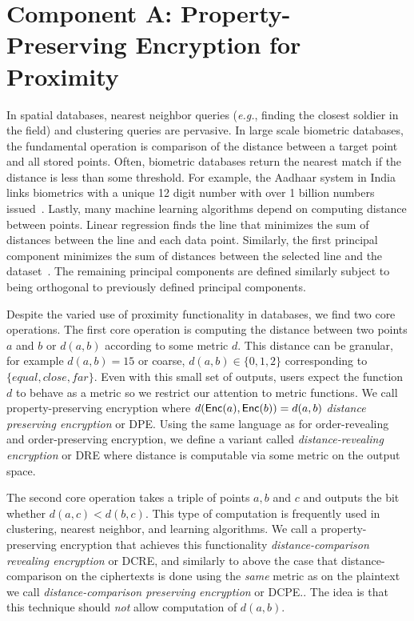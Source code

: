 
\section{Component A:  Property-Preserving Encryption for Proximity}

In spatial databases, nearest neighbor queries (\emph{e.g.}, finding the closest soldier in the field) and clustering queries are pervasive.  %
In large scale biometric databases, the fundamental operation is comparison of the distance between a target point and all stored points. Often, biometric databases return the nearest match if the distance is less than some threshold.  For example, the Aadhaar system in India links biometrics with a unique 12 digit number with over 1 billion numbers issued~\cite{daugman2014600}.  Lastly, many machine learning algorithms depend on computing distance between points. Linear regression finds the line that minimizes the sum of distances between the line and each data point.  Similarly, the first principal component minimizes the sum of distances between the selected line and the dataset~\cite{wold1987principal}.  The remaining principal components are defined similarly subject to being orthogonal to previously defined principal components.

Despite the varied use of proximity functionality in databases, we find two core operations.     The first core operation is computing the distance between two points $a$ and $b$ or $d(a,b)$ according to some metric $d$.  This distance can be granular, for example $d(a, b) =15$ or coarse, $d(a,b)\in\{0,1,2\}$ corresponding to $\{equal, close, far\}$.  Even with this small set of outputs, users expect the function $d$ to behave as a metric so we restrict our attention to metric functions.  We call property-preserving encryption where $d(\mathsf{Enc}(a), \mathsf{Enc}(b)) = d(a,b)$ \emph{distance preserving encryption} or DPE.  Using the same language as for order-revealing and order-preserving encryption, we define a variant called \emph{distance-revealing encryption} or DRE where distance is computable  via some metric on the output space.

The second core operation takes a triple of points $a,b$ and $c$ and outputs the bit whether $d(a,c)<d(b,c)$.  This type of computation is frequently used in clustering, nearest neighbor, and learning algorithms.   We call a property-preserving encryption that achieves this functionality \emph{distance-comparison revealing encryption} or DCRE, and similarly to above the case that distance-comparison  on the ciphertexts is done using the \emph{same} metric as on the plaintext we call \emph{distance-comparison preserving encryption} or DCPE..  The idea is that this technique should \emph{not} allow computation of $d(a,b)$.

